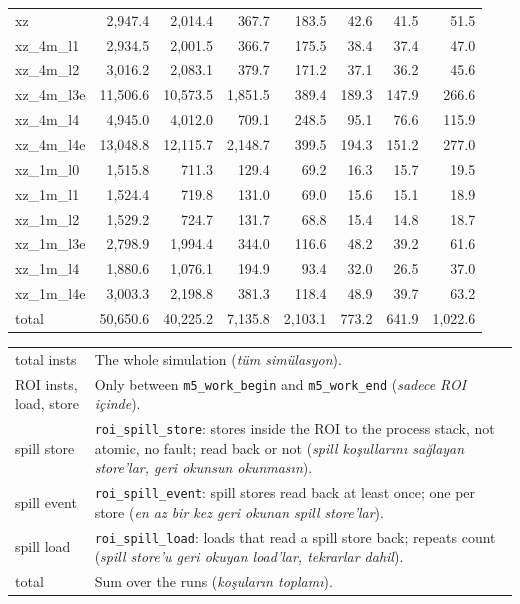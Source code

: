 \documentclass[10pt,a4paper]{article}
\newcommand{\ct}[1]{\texttt{#1}}
\renewcommand{\arraystretch}{1.2}
\begin{document}
{\begin{longtable}{@{}lrrrrrrr@{}}
\midrule
\endhead
\bottomrule
\endlastfoot
xz & 2,947.4 & 2,014.4 & 367.7 & 183.5 & 42.6 & 41.5 & 51.5 \\
xz\_4m\_l1 & 2,934.5 & 2,001.5 & 366.7 & 175.5 & 38.4 & 37.4 & 47.0 \\
xz\_4m\_l2 & 3,016.2 & 2,083.1 & 379.7 & 171.2 & 37.1 & 36.2 & 45.6 \\
xz\_4m\_l3e & 11,506.6 & 10,573.5 & 1,851.5 & 389.4 & 189.3 & 147.9 & 266.6 \\
xz\_4m\_l4 & 4,945.0 & 4,012.0 & 709.1 & 248.5 & 95.1 & 76.6 & 115.9 \\
xz\_4m\_l4e & 13,048.8 & 12,115.7 & 2,148.7 & 399.5 & 194.3 & 151.2 & 277.0 \\
xz\_1m\_l0 & 1,515.8 & 711.3 & 129.4 & 69.2 & 16.3 & 15.7 & 19.5 \\
xz\_1m\_l1 & 1,524.4 & 719.8 & 131.0 & 69.0 & 15.6 & 15.1 & 18.9 \\
xz\_1m\_l2 & 1,529.2 & 724.7 & 131.7 & 68.8 & 15.4 & 14.8 & 18.7 \\
xz\_1m\_l3e & 2,798.9 & 1,994.4 & 344.0 & 116.6 & 48.2 & 39.2 & 61.6 \\
xz\_1m\_l4 & 1,880.6 & 1,076.1 & 194.9 & 93.4 & 32.0 & 26.5 & 37.0 \\
xz\_1m\_l4e & 3,003.3 & 2,198.8 & 381.3 & 118.4 & 48.9 & 39.7 & 63.2 \\
\midrule
total & 50,650.6 & 40,225.2 & 7,135.8 & 2,103.1 & 773.2 & 641.9 & 1,022.6 \\
\end{longtable}
}
{\footnotesize\renewcommand{\arraystretch}{1.0}
\begin{tabularx}{\textwidth}{@{}>{\raggedright\arraybackslash}p{27mm} >{\raggedright\arraybackslash}X@{}}
total insts & The whole simulation (\textit{t\"um sim\"ulasyon}). \\
ROI insts, load, store & Only between \ct{m5\_work\_begin} and \ct{m5\_work\_end} (\textit{sadece ROI i\c{c}inde}). \\
spill store & \ct{roi\_spill\_store}: stores inside the ROI to the process stack, not atomic, no fault; read back or not (\textit{spill ko\c{s}ullar{\i}n{\i} sa\u{g}layan store'lar, geri okunsun okunmas{\i}n}). \\
spill event & \ct{roi\_spill\_event}: spill stores read back at least once; one per store (\textit{en az bir kez geri okunan spill store'lar}). \\
spill load & \ct{roi\_spill\_load}: loads that read a spill store back; repeats count (\textit{spill store'u geri okuyan load'lar, tekrarlar dahil}). \\
total & Sum over the runs (\textit{ko\c{s}ular{\i}n toplam{\i}}). \\
\end{tabularx}\par}
\end{document}
